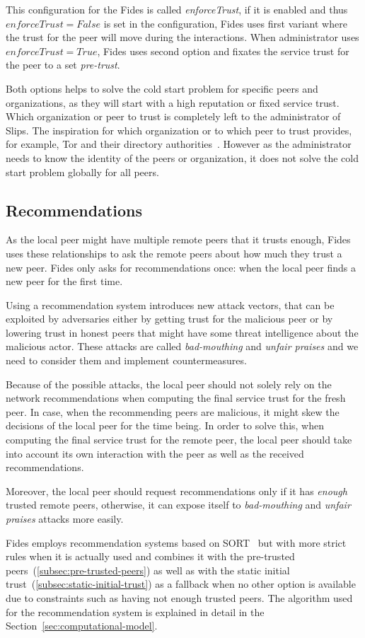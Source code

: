 This configuration for the Fides is called \textit{enforceTrust}, if it is enabled and thus $enforceTrust = False$ is set in the configuration, Fides uses first variant where the trust for the peer will move during the interactions. When administrator uses $enforceTrust = True$, Fides uses second option and fixates the service trust for the peer to a set \textit{pre-trust}.

Both options helps to solve the cold start problem for specific peers and organizations, as they will start with a high reputation or fixed service trust. Which organization or peer to trust is completely left to the administrator of Slips. 
The inspiration for which organization or to which peer to trust provides, for example, Tor and their directory authorities~\cite{torauth}. However as the administrator needs to know the identity of the peers or organization, it does not solve the cold start problem globally for all peers.

\subsection{Recommendations}
\label{subsec:recommendations}
As the local peer might have multiple remote peers that it trusts enough, Fides uses these relationships to ask the remote peers about how much they trust a new peer. Fides only asks for recommendations once: when the local peer finds a new peer for the first time.  

Using a recommendation system introduces new attack vectors, that can be exploited by adversaries either by getting trust for the malicious peer or by lowering trust in honest peers that might have some threat intelligence about the malicious actor. 
These attacks are called \textit{bad-mouthing} and \textit{unfair praises} and we need to consider them and implement countermeasures.

Because of the possible attacks, the local peer should not solely rely on the network recommendations when computing the final service trust for the fresh peer. In case, when the recommending peers are malicious, it might skew the decisions of the local peer for the time being.
In order to solve this, when computing the final service trust for the remote peer, the local peer should take into account its own interaction with the peer as well as the received recommendations.

Moreover, the local peer should request recommendations only if it has \textit{enough} trusted remote peers, otherwise, it can expose itself to \textit{bad-mouthing} and \textit{unfair praises} attacks more easily.

\vspace{7mm}

Fides employs recommendation systems based on SORT~\cite{sort} but with more strict rules when it is actually used and combines it with the pre-trusted peers~(\ref{subsec:pre-trusted-peers}) as well as with the static initial trust~(\ref{subsec:static-initial-trust}) as a fallback when no other option is available due to constraints such as having not enough trusted peers.
The algorithm used for the recommendation system is explained in detail in the Section~\ref{sec:computational-model}.